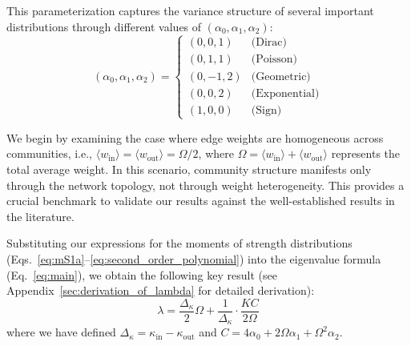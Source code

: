 \documentclass[a4paper,pre,superscriptaddress,floatfix,nofootinbib,twocolumn]{revtex4-1}
\begin{document}
This parameterization captures the variance structure of several important distributions through different values of $(\alpha_0, \alpha_1, \alpha_2)$:
\begin{equation}
    (\alpha_0, \alpha_1, \alpha_2) =
    \left\{
    \begin{array}{ll}
        (0, 0, 1) & \text{(Dirac)} \\
        (0, 1, 1) & \text{(Poisson)} \\
        (0, -1, 2) & \text{(Geometric)} \\
        (0, 0, 2) & \text{(Exponential)} \\
        (1, 0, 0) & \text{(Sign)}
    \end{array}
    \right.
    \label{eq:second_order_polynomial_family}
\end{equation}

We begin by examining the case where edge weights are homogeneous across communities, i.e., $\langle w_\text{in} \rangle = \langle w_\text{out} \rangle = \Omega/2$, where $\Omega = \langle w_\text{in} \rangle + \langle w_\text{out} \rangle$ represents the total average weight.
In this scenario, community structure manifests only through the network topology, not through weight heterogeneity. This provides a crucial benchmark to validate our results against the well-established results in the literature.

Substituting our expressions for the moments of strength distributions (Eqs.~\eqref{eq:mS1a}--\eqref{eq:second_order_polynomial}) into the eigenvalue formula (Eq.~\eqref{eq:main}), we obtain the following key result (see Appendix~\ref{sec:derivation_of_lambda} for detailed derivation):
\begin{equation}
    \lambda = \frac{\Delta_{\kappa}}{2}\Omega + \frac{1}{\Delta_{\kappa}} \cdot \frac{KC}{2\Omega}
\label{eq:lambda_moment_homogeneous_weights}
\end{equation}
where we have defined $\Delta_{\kappa} = \kappa_\text{in} - \kappa_\text{out}$ and $C =  4\alpha_0  + 2\Omega\alpha_1 + \Omega^2\alpha_2$.
\end{document}
